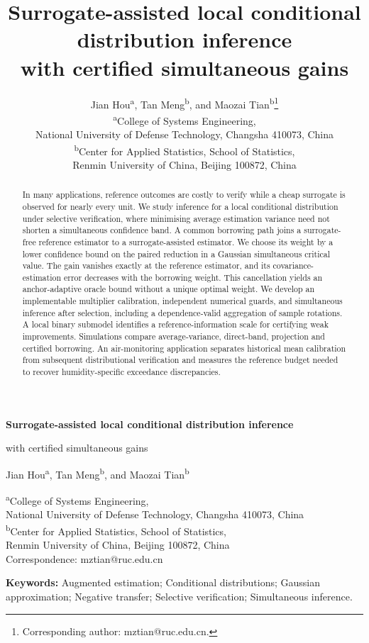 \documentclass[12pt,a4paper]{article}
\title{Surrogate-assisted local conditional distribution inference\\with certified simultaneous gains}
\author{Jian Hou\textsuperscript{a}, Tan Meng\textsuperscript{b}, and Maozai Tian\textsuperscript{b}\thanks{Corresponding author: mztian@ruc.edu.cn.}\\[.4em]
\normalsize\textsuperscript{a}College of Systems Engineering,\\
\normalsize National University of Defense Technology, Changsha 410073, China\\
\normalsize\textsuperscript{b}Center for Applied Statistics, School of Statistics,\\\normalsize Renmin University of China, Beijing 100872, China}
\date{}
\begin{document}
\begin{center}
{\Large\bfseries Surrogate-assisted local conditional distribution inference\par
with certified simultaneous gains\par}
\vspace{0.8em}
{\normalsize Jian Hou\textsuperscript{a}, Tan Meng\textsuperscript{b}, and Maozai Tian\textsuperscript{b}\par}
\vspace{0.4em}
\begin{minipage}{\textwidth}\centering\normalsize{}
\textsuperscript{a}College of Systems Engineering,\\
National University of Defense Technology, Changsha 410073, China\\[0.4em]
\textsuperscript{b}Center for Applied Statistics, School of Statistics,\\
Renmin University of China, Beijing 100872, China\\[0.4em]
Correspondence: mztian@ruc.edu.cn
\end{minipage}
\end{center}
\begin{abstract}\normalsize
In many applications, reference outcomes are costly to verify while a cheap surrogate is observed for nearly every unit. We study inference for a local conditional distribution under selective verification, where minimising average estimation variance need not shorten a simultaneous confidence band. A common borrowing path joins a surrogate-free reference estimator to a surrogate-assisted estimator. We choose its weight by a lower confidence bound on the paired reduction in a Gaussian simultaneous critical value. The gain vanishes exactly at the reference estimator, and its covariance-estimation error decreases with the borrowing weight. This cancellation yields an anchor-adaptive oracle bound without a unique optimal weight. We develop an implementable multiplier calibration, independent numerical guards, and simultaneous inference after selection, including a dependence-valid aggregation of sample rotations. A local binary submodel identifies a reference-information scale for certifying weak improvements. Simulations compare average-variance, direct-band, projection and certified borrowing. An air-monitoring application separates historical mean calibration from subsequent distributional verification and measures the reference budget needed to recover humidity-specific exceedance discrepancies.
\end{abstract}
\noindent\textbf{Keywords:} Augmented estimation; Conditional distributions; Gaussian approximation; Negative transfer; Selective verification; Simultaneous inference.








\clearpage
\end{document}
